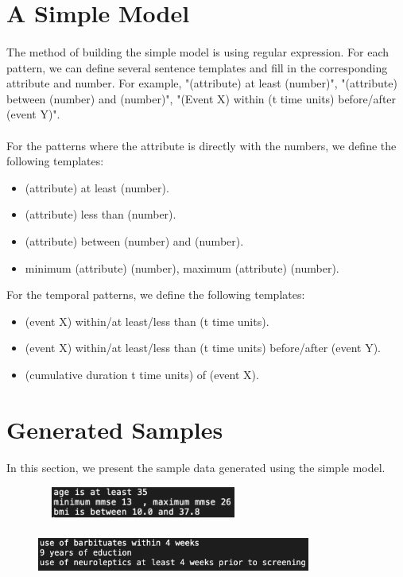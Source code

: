 \documentclass{article}
\begin{document}
\section{A Simple Model}
\paragraph{}
The method of building the simple model is using regular expression. For each pattern, we can define several sentence templates and fill in the corresponding attribute and number. For example, "(attribute) at least (number)", "(attribute) between (number) and (number)", "(Event X) within (t time units) before/after (event Y)". \\
\\
For the patterns where the attribute is directly with the numbers, we define the following templates:
\begin{itemize}
  \item (attribute) at least (number).
  \item (attribute) less than (number).
  \item (attribute) between (number) and (number).
  \item minimum (attribute) (number), maximum (attribute) (number).
\end{itemize}

\noindent For the temporal patterns, we define the following templates:
\begin{itemize}
  \item (event X) within/at least/less than (t time units).
  \item (event X) within/at least/less than (t time units) before/after (event Y).
  \item (cumulative duration t time units) of (event X).
\end{itemize}


\section{Generated Samples}
\paragraph{}
In this section, we present the sample data generated using the simple model. 

\begin{figure}[!hbt]
\centering
\includegraphics[width=7cm, height=1cm]{figs/sample1.png}
\caption{}
\label{f:res1}
\end{figure}


\begin{figure}[!hbt]
\centering
\includegraphics[width=9cm, height=1.5cm]{figs/sample2.png}
\caption{}
\label{f:res2}
\end{figure}
\end{document}
